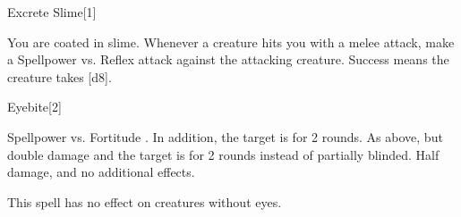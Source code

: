 \begin{spellsection}{Excrete Slime}[1]
    \begin{spellheader}
    \end{spellheader}
    \begin{spellcontent}
        \begin{spelltargetinginfo}
        \end{spelltargetinginfo}
        \begin{spelleffects}
            \spelleffect You are coated in slime. Whenever a creature hits you with a melee attack, make a Spellpower vs. Reflex attack against the attacking creature. Success means the creature takes [d8].
            \spelldur \durshort
        \end{spelleffects}
    \end{spellcontent}
    \begin{spellfooter}
        \miscastexplode
    \end{spellfooter}
\end{spellsection}

\begin{spellsection}{Eyebite}[2]
    \begin{spellcontent}
        \begin{spelltargetinginfo}
        \end{spelltargetinginfo}
        \begin{spelleffects}
            \begin{spellattack}{Spellpower vs. Fortitude}
                \spellsuccess {}. In addition, the target is \partiallyblinded for 2 rounds.
                \spellcritical As above, but double damage and the target is \blinded for 2 rounds instead of partially blinded.
                \spellfailure Half damage, and no additional effects.
            \end{spellattack}
        \end{spelleffects}
    \end{spellcontent}
    \begin{spellfooter}
        \spellnotes This spell has no effect on creatures without eyes.
        \miscastrandom
    \end{spellfooter}
    \begin{spellaugments}
    \end{spellaugments}
\end{spellsection}

